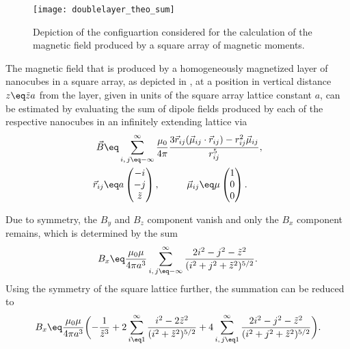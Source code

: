 \documentclass[\main/dresen_thesis.tex]{subfiles}
\begin{document}
  \label{sec:doublelayers:magnetism:intro}

  \begin{figure}[tb]
    \centering
    \texttt{[image: doublelayer\_theo\_sum]}
    \caption{\label{fig:doublelayers:magnetism:theoImage}Depiction of the configuartion considered for the calculation of the magnetic field produced by a square array of magnetic moments.}
  \end{figure}

  The magnetic field that is produced by a homogeneously magnetized layer of nanocubes in a square array, as depicted in , at a position in vertical distance $z \eq \tilde{z} a$ from the layer, given in units of the square array lattice constant $a$, can be estimated by evaluating the sum of dipole fields produced by each of the respective nanocubes in an infinitely extending lattice via
  \begin{align}
    \begin{split}
      \vec{B} \eq& \sum_{i,\, j \eq -\infty}^\infty \frac{\mu_0}{4 \pi} \frac{3 \vec{r}_{ij} (\vec{\mu}_{ij} \cdot \vec{r}_{ij}) - r_{ij}^2 \vec{\mu}_{ij}}{r_{ij}^5},\\
      \vec{r}_{ij} \eq& a \begin{pmatrix}-i\\-j\\\tilde{z}\end{pmatrix}, \hspace{1cm}
      \vec{\mu}_{ij} \eq \mu \begin{pmatrix}1\\0\\0\end{pmatrix}.
    \end{split}
  \end{align}

  Due to symmetry, the $B_y$ and $B_z$ component vanish and only the $B_x$ component remains, which is determined by the sum
  \begin{align}
    B_x \eq& \frac{\mu_0 \mu}{4 \pi a^3} \sum_{i,\, j \eq -\infty}^\infty  \frac{2 i^2 - j^2 - \tilde{z}^2}{(i^2 + j^2 + \tilde{z}^2)^{5/2}}.\\
  \end{align}
  Using the symmetry of the square lattice further, the summation can be reduced to
  \begin{align}
    B_x \eq& \frac{\mu_0 \mu}{4 \pi a^3} \biggl( -\frac{1}{\tilde{z}^3} + 2 \sum_{i \eq 1}^\infty \frac{i^2 - 2\tilde{z}^2}{(i^2 + \tilde{z}^2)^{5/2}} + 4 \sum_{i,\, j \eq 1}^\infty  \frac{2 i^2 - j^2 - \tilde{z}^2}{(i^2 + j^2 + \tilde{z}^2)^{5/2}} \biggr).\\
  \end{align}
\end{document}
